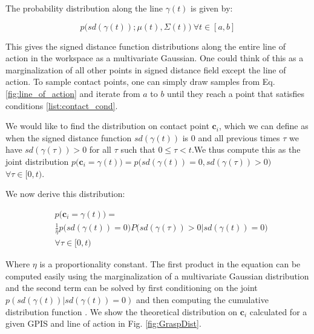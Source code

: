 \documentclass[letterpaper, 10 pt, conference]{ieeeconf}  %
\begin{document}
The probability distribution along the line $\gamma(t)$ is given by:

\vspace{-2ex}
\begin{equation} \label{eq:line_of_act_dist}
p\big(sd(\gamma(t)) ; \mu(t),\Sigma(t)\big) \ \forall t \in [a,b] 
\end{equation}

This gives the signed distance function distributions along the entire line of action in the workspace as a multivariate Gaussian. One could think of this as a marginalization of all other points in signed distance field except the line of action. To sample contact points, one can simply draw samples from Eq. \ref{fig:line_of_action} and iterate from $a$ to $b$ until they reach a point that satisfies conditions \ref{list:contact_cond}. 


We would like to find the distribution on contact point $\textbf{c}_i$, which we can define as when the signed distance function $sd(\gamma(t))$ is $0$ and all previous times $\tau$ we have $sd(\gamma(\tau)) > 0$ for all $\tau$ such that $0 \leq \tau < t$.We thus compute this as the joint distribution $p\big( \textbf{c}_i= \gamma(t)\big) = p\big(sd(\gamma(t))=0, sd(\gamma(\tau))> 0 \big)$ $  \forall \tau \in [0,t)$.

We now derive this distribution: 

\vspace{-2ex}
\begin{align}
 & p\big(\textbf{c}_i = \gamma(t)\big) = \label{eq:contact_theory} \\
  & \frac{1}{\eta} p\big(sd(\gamma(t)) = 0\big)P\big(sd(\gamma(\tau)) > 0 | sd(\gamma(t)) = 0\big) \\
  & \forall \tau \in [0,t)
\end{align}


Where $\eta$ is a proportionality constant. The first product in the equation can be computed easily using the marginalization of a multivariate Gaussian distribution and the second term can be solved by first conditioning on the joint $p(sd(\gamma(t))|sd(\gamma(t)) = 0)$ and then computing the cumulative distribution function  \cite{petersen2008matrix}.  We show the theoretical distribution on $\textbf{c}_i$ calculated for a given GPIS and line of action in Fig.
\ref{fig:GraspDist}.
\end{document}
